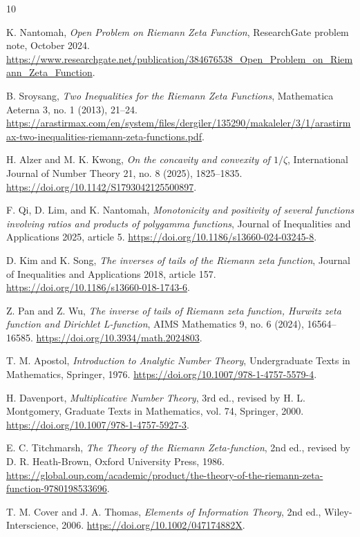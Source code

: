 \documentclass[11pt]{article}
\numberwithin{equation}{section}
\theoremstyle{definition}
\theoremstyle{remark}
\newcommand{\1}{\mathbf 1}
\begin{document}
\begin{thebibliography}{10}

K. Nantomah,
\emph{Open Problem on Riemann Zeta Function},
ResearchGate problem note, October 2024.
\url{https://www.researchgate.net/publication/384676538_Open_Problem_on_Riemann_Zeta_Function}.

B. Sroysang,
\emph{Two Inequalities for the Riemann Zeta Functions},
Mathematica Aeterna 3, no. 1 (2013), 21--24.
\url{https://arastirmax.com/en/system/files/dergiler/135290/makaleler/3/1/arastirmax-two-inequalities-riemann-zeta-functions.pdf}.

H. Alzer and M. K. Kwong,
\emph{On the concavity and convexity of \(1/\zeta\)},
International Journal of Number Theory 21, no. 8 (2025), 1825--1835.
\url{https://doi.org/10.1142/S1793042125500897}.

F. Qi, D. Lim, and K. Nantomah,
\emph{Monotonicity and positivity of several functions involving ratios and products of polygamma functions},
Journal of Inequalities and Applications 2025, article 5.
\url{https://doi.org/10.1186/s13660-024-03245-8}.

D. Kim and K. Song,
\emph{The inverses of tails of the Riemann zeta function},
Journal of Inequalities and Applications 2018, article 157.
\url{https://doi.org/10.1186/s13660-018-1743-6}.

Z. Pan and Z. Wu,
\emph{The inverse of tails of Riemann zeta function, Hurwitz zeta function and Dirichlet L-function},
AIMS Mathematics 9, no. 6 (2024), 16564--16585.
\url{https://doi.org/10.3934/math.2024803}.

T. M. Apostol,
\emph{Introduction to Analytic Number Theory},
Undergraduate Texts in Mathematics, Springer, 1976.
\url{https://doi.org/10.1007/978-1-4757-5579-4}.

H. Davenport,
\emph{Multiplicative Number Theory},
3rd ed., revised by H. L. Montgomery, Graduate Texts in Mathematics, vol. 74, Springer, 2000.
\url{https://doi.org/10.1007/978-1-4757-5927-3}.

E. C. Titchmarsh,
\emph{The Theory of the Riemann Zeta-function},
2nd ed., revised by D. R. Heath-Brown, Oxford University Press, 1986.
\url{https://global.oup.com/academic/product/the-theory-of-the-riemann-zeta-function-9780198533696}.

T. M. Cover and J. A. Thomas,
\emph{Elements of Information Theory},
2nd ed., Wiley-Interscience, 2006.
\url{https://doi.org/10.1002/047174882X}.

\end{thebibliography}
\end{document}
